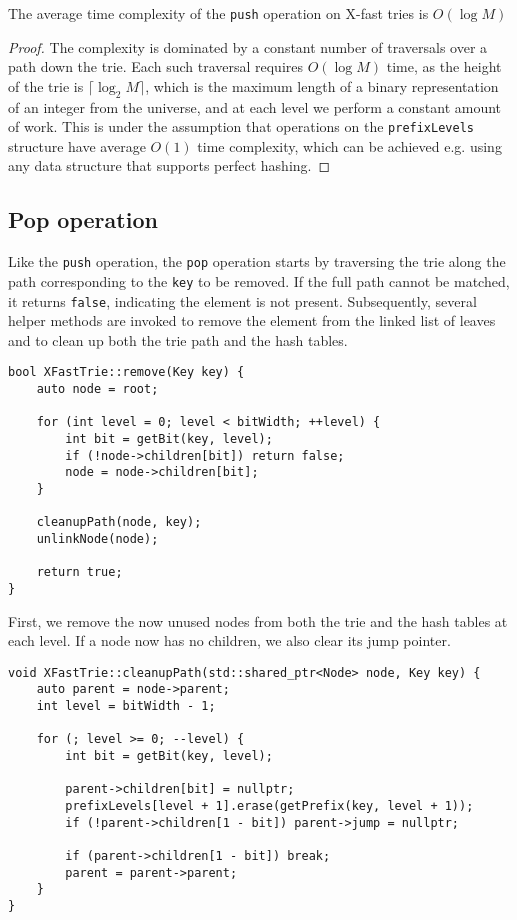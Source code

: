 \begin{lemma}
The average time complexity of the \texttt{push} operation on X-fast tries is \( O(\log M) \)
\end{lemma}

\begin{proof}
The complexity is dominated by a constant number of traversals over a path down the trie. Each such traversal requires \( O(\log M) \) time, as the height of the trie is \( \lceil \log_2 M \rceil \), which is the maximum length of a binary representation of an integer from the universe, and at each level we perform a constant amount of work. This is under the assumption that operations on the \texttt{prefixLevels} structure have average \( O(1) \) time complexity, which can be achieved e.g. using any data structure that supports perfect hashing.
\end{proof}

\subsection{Pop operation}
Like the \texttt{push} operation, the \texttt{pop} operation starts by traversing the trie along the path corresponding to the \texttt{key} to be removed. If the full path cannot be matched, it returns \texttt{false}, indicating the element is not present. Subsequently, several helper methods are invoked to remove the element from the linked list of leaves and to clean up both the trie path and the hash tables.

\begin{verbatim}
bool XFastTrie::remove(Key key) {
    auto node = root;

    for (int level = 0; level < bitWidth; ++level) {
        int bit = getBit(key, level);
        if (!node->children[bit]) return false;
        node = node->children[bit];
    }

    cleanupPath(node, key);
    unlinkNode(node);

    return true;
}
\end{verbatim}

First, we remove the now unused nodes from both the trie and the hash tables at each level. If a node now has no children, we also clear its jump pointer.

\begin{verbatim}
void XFastTrie::cleanupPath(std::shared_ptr<Node> node, Key key) {
    auto parent = node->parent;
    int level = bitWidth - 1;

    for (; level >= 0; --level) {
        int bit = getBit(key, level);

        parent->children[bit] = nullptr;
        prefixLevels[level + 1].erase(getPrefix(key, level + 1));
        if (!parent->children[1 - bit]) parent->jump = nullptr;

        if (parent->children[1 - bit]) break;
        parent = parent->parent;
    }
}
\end{verbatim}

